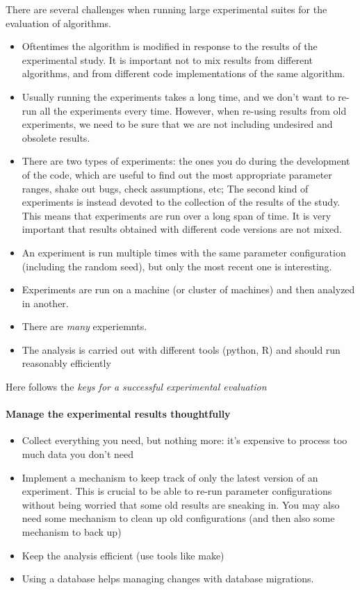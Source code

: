 \documentclass{llncs}
\begin{document}
There are several challenges when running large experimental suites
for the evaluation of algorithms.

\begin{itemize}
\item Oftentimes the algorithm is modified in response to the results
  of the experimental study. It is important not to mix results from
  different algorithms, and from different code implementations of the
  same algorithm.
\item Usually running the experiments takes a long time, and we don't
  want to re-run all the experiments every time. However, when
  re-using results from old experiments, we need to be sure that we
  are not including undesired and obsolete results.
\item There are two types of experiments: the ones you do during the
  development of the code, which are useful to find out the most
  appropriate parameter ranges, shake out bugs, check assumptions,
  etc; The second kind of experiments is instead devoted to the
  collection of the results of the study. This means that experiments
  are run over a long span of time. It is very important that results
  obtained with different code versions are not mixed.
\item An experiment is run multiple times with the same parameter
  configuration (including the random seed), but only the most recent
  one is interesting.
\item Experiments are run on a machine (or cluster of machines) and then
  analyzed in another.
\item There are \emph{many} experiemnts.
\item The analysis is carried out with different tools (python, R) and
  should run reasonably efficiently
\end{itemize}

Here follows the \emph{keys for a successful experimental evaluation}

\paragraph{Manage the experimental results thoughtfully}

\begin{itemize}
\item Collect everything you need, but nothing more: it's expensive to process too
  much data you don't need
\item Implement a mechanism to keep track of only the latest version of an
  experiment. This is crucial to be able to re-run parameter configurations
  without being worried that some old results are sneaking in. You may also
  need some mechanism to clean up old configurations (and then also some
  mechanism to back up)
\item Keep the analysis efficient (use tools like make)
\item Using a database helps managing changes with database migrations.
\end{itemize}
\end{document}

